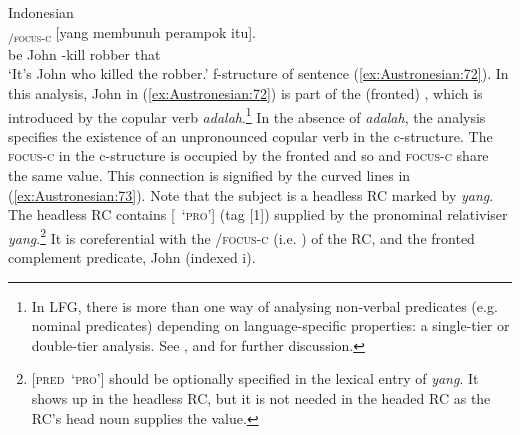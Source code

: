 \documentclass[output=paper,chinesefont]{../langscibook}
\begin{document}
\ea\label{ex:Austronesian:72} Indonesian\\
\textsubscript{\PRED/\textsc{focus-c}} [yang membunuh perampok itu]\textsubscript{\SUBJ}.\\
\phantom{[}be John \phantom{[}{\REL} \AV-kill robber that\\
\glt `It's John who killed the robber.'
\z
\ea\label{ex:Austronesian:73} f-structure of sentence (\ref{ex:Austronesian:72}).
\z
In this analysis, John in (\ref{ex:Austronesian:72}) is part of the (fronted) \PREDLINK \citep{ButtEtAl1999}, which is introduced by the copular verb \emph{adalah}.\footnote{In LFG, there is more than one way of analysing non-verbal predicates (e.g. nominal predicates) depending on language-specific properties: a single-tier or double-tier analysis. See \citet{Andrews82}, \citet{ButtEtAl1999} and \citet{dalrympleetal04copular} for further discussion.} In the absence of \emph{adalah}, the analysis specifies the existence of an unpronounced copular verb in the c-struc\-ture. The \textsc{focus-c} in the c-structure is occupied by the fronted \PREDLINK and so \PREDLINK and \textsc{focus-c} share the same value. This connection is signified by the curved lines in (\ref{ex:Austronesian:73}). Note that the subject is a headless RC marked by \emph{yang}. The headless RC contains [\PRED~\textsc{`pro'}] (tag [1]) supplied by the pronominal relativiser \emph{yang}.\footnote{\textsc{[pred~`pro']} should be optionally specified in the lexical entry of \emph{yang}. It shows up in the headless RC, but it is not needed in the headed RC as the RC's head noun supplies the \PRED value.} It is coreferential with the \SUBJ/\textsc{focus-c} (i.e. \PIVOT) of the RC, and the fronted complement predicate, John (indexed i).
\end{document}
